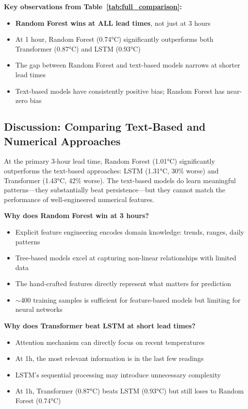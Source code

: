 \documentclass[11pt,letterpaper]{article}
\begin{document}
\textbf{Key observations from Table~\ref{tab:full_comparison}:}
\begin{itemize}[noitemsep]
    \item \textbf{Random Forest wins at ALL lead times}, not just at 3 hours
    \item At 1 hour, Random Forest (0.74°C) significantly outperforms both Transformer (0.87°C) and LSTM (0.93°C)
    \item The gap between Random Forest and text-based models narrows at shorter lead times
    \item Text-based models have consistently positive bias; Random Forest has near-zero bias
\end{itemize}

\subsection{Discussion: Comparing Text-Based and Numerical Approaches}

At the primary 3-hour lead time, Random Forest (1.01°C) significantly outperforms the text-based approaches: LSTM (1.31°C, 30\% worse) and Transformer (1.43°C, 42\% worse). The text-based models do learn meaningful patterns---they substantially beat persistence---but they cannot match the performance of well-engineered numerical features.

\textbf{Why does Random Forest win at 3 hours?}
\begin{itemize}[noitemsep]
    \item Explicit feature engineering encodes domain knowledge: trends, ranges, daily patterns
    \item Tree-based models excel at capturing non-linear relationships with limited data
    \item The hand-crafted features directly represent what matters for prediction
    \item $\sim$400 training samples is sufficient for feature-based models but limiting for neural networks
\end{itemize}

\textbf{Why does Transformer beat LSTM at short lead times?}
\begin{itemize}[noitemsep]
    \item Attention mechanism can directly focus on recent temperatures
    \item At 1h, the most relevant information is in the last few readings
    \item LSTM's sequential processing may introduce unnecessary complexity
    \item At 1h, Transformer (0.87°C) beats LSTM (0.93°C) but still loses to Random Forest (0.74°C)
\end{itemize}
\end{document}
